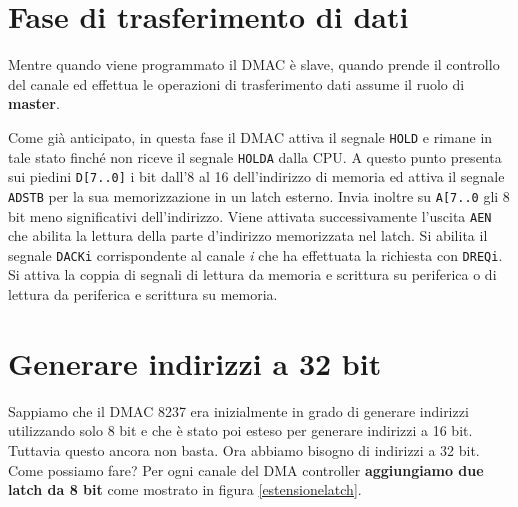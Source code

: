 \documentclass[11pt]{book}
\begin{document}



\section{Fase di trasferimento di dati}

Mentre quando viene programmato il DMAC \`e slave, quando prende il
controllo del canale ed effettua le operazioni di trasferimento dati
assume il ruolo di \textbf{master}.

Come gi\`a anticipato, in questa fase il DMAC attiva il segnale
\texttt{HOLD} e rimane in tale stato finch\'e non riceve il segnale
\texttt{HOLDA} dalla CPU. A questo punto presenta sui piedini
\texttt{D[7..0]} i bit dall'8 al 16 dell'indirizzo di memoria ed
attiva il segnale \texttt{ADSTB} per la sua memorizzazione in un latch
esterno. Invia inoltre su {\tt A[7..0} gli 8 bit meno significativi
dell'indirizzo. Viene attivata successivamente l'uscita \texttt{AEN}
che abilita la lettura della parte d'indirizzo memorizzata nel
latch. Si abilita il segnale \texttt{DACKi} corrispondente al canale
\textit{i} che ha effettuata la richiesta con \texttt{DREQi}. Si
attiva la coppia di segnali di lettura da memoria e scrittura su
periferica o di lettura da periferica e scrittura su memoria.

\section{Generare indirizzi a 32 bit}

Sappiamo che il DMAC 8237 era inizialmente in grado di generare
indirizzi utilizzando solo 8 bit e che \`e stato poi esteso per
generare indirizzi a 16 bit. Tuttavia questo ancora non basta. Ora
abbiamo bisogno di indirizzi a 32 bit. Come possiamo fare? Per ogni
canale del DMA controller \textbf{aggiungiamo due latch da 8 bit}
come mostrato in figura \ref{estensionelatch}.
\end{document}
